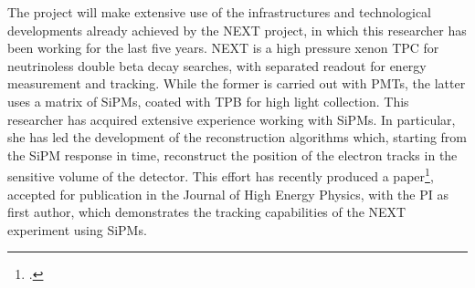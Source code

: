  The project will make extensive use of the infrastructures and technological developments already achieved by the NEXT project, in which this researcher has been working for the last five years. NEXT is a high pressure xenon TPC for neutrinoless double beta decay searches, with separated readout for energy measurement and tracking. While the former is carried out with PMTs, the latter uses a matrix of SiPMs, coated with TPB for high light collection. This researcher has acquired extensive experience working with SiPMs. In particular, she has led the development of the reconstruction algorithms which, starting from the SiPM response in time, reconstruct the position of the electron tracks in the sensitive volume of the detector. This effort has recently produced a paper\footcite{Ferrario:2015kta}, accepted for publication in the Journal of High Energy Physics, with the PI as first author, which demonstrates the tracking capabilities of the NEXT experiment using SiPMs. 

%
%
%
%

